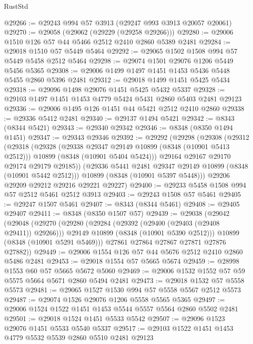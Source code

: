 \begin{lexlean}{RustStd}
\begin{coremodule}
@29266 := @29243 @994 @57 @3913 (@29247 @993 @3913 @20057 @20061)
@29270 := @29058 (@29062 (@29229 (@29258 @29266)))
@29280 := @29006 @1510 @126 @57 @44 @5466 @2512 @2410 @2860 @5389 @2481
@29284 := @29018 @1510 @57 @5449 @5464
@29292 := @29065 @1502 @1508 @994 @57 @5449 @5458 @2512 @5464
@29298 := @29074 @1501 @29076 @1206 @5449 @5456 @5365
@29308 := @29006 @1499 @1497 @1451 @1453 @5436 @5448 @5455 @2860 @5396 @2481
@29312 := @29018 @1499 @1451 @5425 @5434
@29318 := @29096 @1498 @29076 @1451 @5425 @5432 @5337
@29328 := @29103 @1497 @1451 @1453 @4779 @5424 @5431 @2860 @5403 @2481 @29123
@29336 := @29006 @1495 @126 @1451 @44 @5421 @2512 @2410 @2860
@29338 := @29336 @5412 @2481
@29340 := @29137 @1494 @5421
@29342 := @8343 (@8344 @5421)
@29343 := @29340 @29342
@29346 := @8348 (@8350 @1494 @1451)
@29347 := @29343 @29346
@29392 := @29292
    (@29298
      (@29308
        (@29312
          (@29318
            (@29328
              (@29338 @29347 @29149 @10899 (@8348 (@10901 @5413 @2512)))
              @10899
              (@8348 (@10901 @5404 @5424)))
            @29164
            @29167
            @29170
            @29174
            @29179
            @29185))
        (@29336 @5441 @2481 @29347 @29149 @10899 (@8348 (@10901 @5442 @2512)))
        @10899
        (@8348 (@10901 @5397 @5448)))
      @29206
      @29209
      @29212
      @29216
      @29221
      @29227)
@29400 := @29233 @5458 @1508 @994 @57 @2512 @5461 @2512 @3913
@29403 := @29243 @1508 @57 @5461
@29405 := @29247 @1507 @5461
@29407 := @8343 (@8344 @5461)
@29408 := @29405 @29407
@29411 := @8348 (@8350 @1507 @57)
@29439 := @29038
    (@29042
      (@29048
        (@29270
          (@29280
            (@29284 (@29392 (@29400 (@29403 (@29408 @29411)) @29266)))
            @29149
            @10899
            (@8348 (@10901 @5390 @2512)))
          @10899
          (@8348 (@10901 @5291 @5469)))
        @27861
        @27864
        @27867
        @27871
        @27876
        @27882))
@29449 := @29006 @1554 @126 @57 @44 @5676 @2512 @2410 @2860 @5486 @2481
@29453 := @29018 @1554 @57 @5665 @5674
@29459 := @28998 @1553 @60 @57 @5665 @5672 @5060
@29469 := @29006 @1532 @1552 @57 @59 @5575 @5664 @5671 @2860 @5494 @2481
@29473 := @29018 @1532 @57 @5558 @5573
@29481 := @29065 @1527 @1530 @994 @57 @5558 @5567 @2512 @5573
@29487 := @29074 @1526 @29076 @1206 @5558 @5565 @5365
@29497 := @29006 @1524 @1522 @1451 @1453 @5544 @5557 @5564 @2860 @5502 @2481
@29501 := @29018 @1524 @1451 @5533 @5542
@29507 := @29096 @1523 @29076 @1451 @5533 @5540 @5337
@29517 := @29103 @1522 @1451 @1453 @4779 @5532 @5539 @2860 @5510 @2481 @29123

\end{coremodule}
\end{lexlean}
